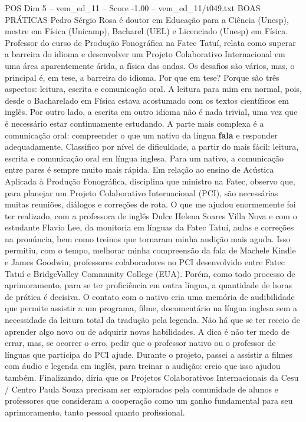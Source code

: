 \begin{textsample}{POS Dim 5 – vem\_ed\_11 – Score -1.00 – vem\_ed\_11/t049.txt}  \label{ex:f5_pos_116}
BOAS PRÁTICAS Pedro Sérgio Rosa é doutor em Educação para a Ciência (Unesp), mestre em Física (Unicamp), Bacharel (UEL) e Licenciado (Unesp) em Física.
Professor do curso de Produção Fonográfica na Fatec Tatuí, relata como superar a barreira do idioma e desenvolver um Projeto Colaborativo Internacional em uma área aparentemente árida, a física das ondas.
Os desafios são vários, mas, o principal é, em tese, a barreira do idioma.
Por que em tese?
Porque são três aspectos: leitura, escrita e comunicação oral.
A leitura para mim era normal, pois, desde o Bacharelado em Física estava acostumado com os textos científicos em inglês.
Por outro lado, a escrita em outro idioma não é nada trivial, uma vez que é necessário estar continuamente estudando.
A parte mais complexa é a comunicação oral: compreender o que um nativo da língua \textbf{fala} e responder adequadamente.
Classifico por nível de dificuldade, a partir do mais fácil: leitura, escrita e comunicação oral em língua inglesa.
Para um nativo, a comunicação entre pares é sempre muito mais rápida.
Em relação ao ensino de Acústica Aplicada à Produção Fonográfica, disciplina que ministro na Fatec, observo que, para planejar um Projeto Colaborativo Internacional (PCI), são necessárias muitas reuniões, diálogos e correções de rota.
O que me ajudou enormemente foi ter realizado, com a professora de inglês Dulce Helena Soares Villa Nova e com o estudante Flavio Lee, da monitoria em línguas da Fatec Tatuí, aulas e correções na pronúncia, bem como treinos que tornaram minha audição mais aguda.
Isso permitiu, com o tempo, melhorar minha compreensão da fala de Machele Kindle e James Goodwin, professores colaboradores no PCI desenvolvido entre Fatec Tatuí e BridgeValley Community College (EUA).
Porém, como todo processo de aprimoramento, para se ter proficiência em outra língua, a quantidade de horas de prática é decisiva.
O contato com o nativo cria uma memória de audibilidade que permite assistir a um programa, filme, documentário na língua inglesa sem a necessidade da leitura total da tradução pela legenda.
Não há que se ter receio de aprender algo novo ou de adquirir novas habilidades.
A dica é não ter medo de errar, mas, se ocorrer o erro, pedir que o professor nativo ou o professor de línguas que participa do PCI ajude.
Durante o projeto, passei a assistir a filmes com áudio e legenda em inglês, para treinar a audição: creio que isso ajudou também.
Finalizando, diria que os Projetos Colaborativos Internacionais da Cesu / Centro Paula Souza precisam ser explorados pela comunidade de alunos e professores que consideram a cooperação como um ganho fundamental para seu aprimoramento, tanto pessoal quanto profissional.

\end{textsample}
